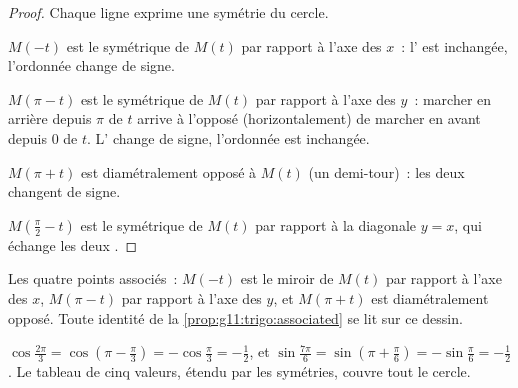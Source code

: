 \begin{proof}
Chaque ligne exprime une symétrie du cercle.

$M(-t)$ est le symétrique de $M(t)$ par rapport à l'axe des $x$~:
l' est inchangée, l'ordonnée change de signe.

$M(\pi - t)$ est le symétrique de $M(t)$ par rapport à l'axe des $y$~:
marcher en arrière depuis $\pi$ de $t$ arrive à l'opposé
(horizontalement) de marcher en avant depuis $0$ de $t$. L'
change de signe, l'ordonnée est inchangée.

$M(\pi + t)$ est diamétralement opposé à $M(t)$ (un demi-tour)~: les
deux  changent de signe.

$M\!\left(\frac\pi2 - t\right)$ est le symétrique de $M(t)$ par rapport
à la diagonale $y = x$, qui échange les deux .
\end{proof}

\begin{omfigure}

{\small Les quatre points associés~: $M(-t)$ est le miroir de $M(t)$ par
rapport à l'axe des $x$, $M(\pi - t)$ par rapport à l'axe des $y$, et
$M(\pi + t)$ est diamétralement opposé. Toute identité de la
\cref{prop:g11:trigo:associated} se lit sur ce dessin.}
\end{omfigure}

\begin{example}
$\cos\frac{2\pi}{3} = \cos\left(\pi - \frac\pi3\right)
= -\cos\frac\pi3 = -\frac12$, et
$\sin\frac{7\pi}{6} = \sin\left(\pi + \frac\pi6\right)
= -\sin\frac\pi6 = -\frac12$. Le tableau de cinq valeurs, étendu par les
symétries, couvre tout le cercle.
\end{example}

